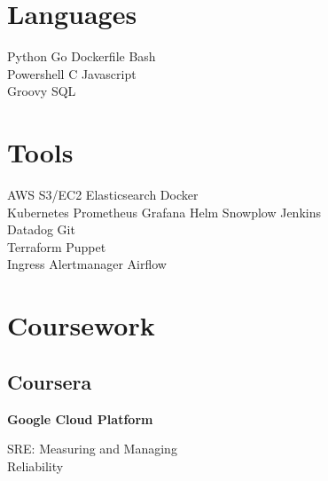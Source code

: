 \documentclass[]{deedy-resume-openfont}
\begin{document}
%
%

%
%

\begin{minipage}[t]{0.33\textwidth} 


\section{Languages} 
Python \textbullet{}   Go  \textbullet{} Dockerfile \textbullet{} Bash \\
\textbullet{} Powershell \textbullet{} C  \textbullet{} Javascript \\
 Groovy \textbullet{} SQL
\sectionsep


\section{Tools} 
AWS S3/EC2 \textbullet{} Elasticsearch \textbullet{} Docker  \\
Kubernetes \textbullet{} Prometheus \textbullet{} Grafana Helm \textbullet{} Snowplow \textbullet{} Jenkins \\
 Datadog  \textbullet{} Git\\
Terraform \textbullet{} Puppet   \\ 
Ingress \textbullet{} Alertmanager \textbullet{} Airflow
\sectionsep




\section{Coursework}
\subsection{Coursera}
\textbf{Google Cloud Platform}

\textbullet{} SRE: Measuring and Managing \\
\hspace{0.7em} Reliability
\sectionsep

\end{minipage}
\end{document}
